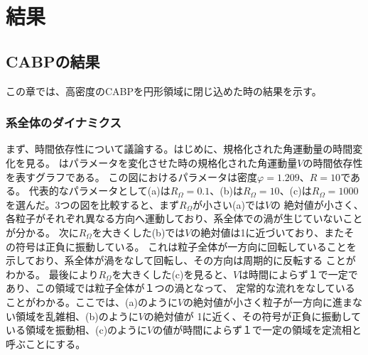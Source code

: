 \documentclass[/Users/ikedahajime/GitHub/reserch/master_report/thesis]{subfiles}
\begin{document}
\chapter{結果}
\section{CABPの結果}
この章では、高密度のCABPを円形領域に閉じ込めた時の結果を示す。%
\subsection{系全体のダイナミクス}
まず、時間依存性について議論する。はじめに、規格化された角運動量の時間変化を見る。
はパラメータを変化させた時の規格化された角運動量$V$の時間依存性を表すグラフである。
この図におけるパラメータは密度$\varphi=1.209$、$R=10$である。
代表的なパラメータとして(a)は$R_{\Omega}=0.1$、(b)は$R_{\Omega}=10$、(c)は$R_{\Omega}=1000$
を選んだ。3つの図を比較すると、まず$R_{\Omega}$が小さい(a)では$V$の
絶対値が小さく、各粒子がそれぞれ異なる方向へ運動しており、系全体での渦が生じていないことが分かる。
次に$R_{\Omega}$を大きくした(b)では$V$の絶対値は1に近づいており、またその符号は正負に振動している。%
これは粒子全体が一方向に回転していることを示しており、系全体が渦をなして回転し、その方向は周期的に反転する
ことがわかる。
最後により$R_{\Omega}$を大きくした(c)を見ると、$V$は時間によらず１で一定であり、この領域では粒子全体が１つの渦となって、
定常的な流れをなしていることがわかる。ここでは、(a)のように$V$の絶対値が小さく粒子が一方向に進まない領域を乱雑相、(b)のように$V$の絶対値が
1に近く、その符号が正負に振動している領域を振動相、(c)のように$V$の値が時間によらず１で一定の領域を定流相と呼ぶことにする。\\
\end{document}
